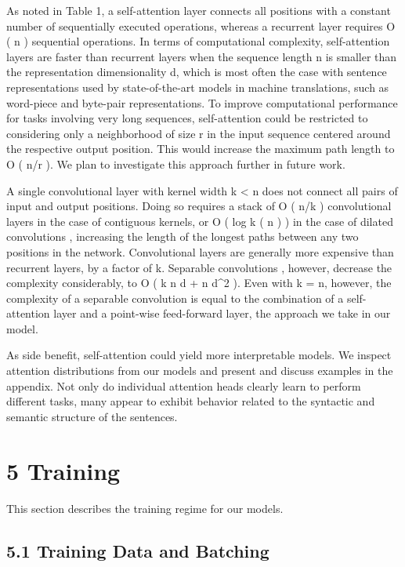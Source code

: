 \documentclass[conference]{IEEEtran}
\begin{document}
As noted in Table 1, a self-attention layer connects all positions with a constant number of sequentially executed operations, whereas a recurrent layer requires O ( n ) sequential operations. In terms of computational complexity, self-attention layers are faster than recurrent layers when the sequence length n is smaller than the representation dimensionality d, which is most often the case with sentence representations used by state-of-the-art models in machine translations, such as word-piece \cite{ref38} and byte-pair \cite{ref31} representations. To improve computational performance for tasks involving very long sequences, self-attention could be restricted to considering only a neighborhood of size r in the input sequence centered around the respective output position. This would increase the maximum path length to O ( n/r ). We plan to investigate this approach further in future work.

A single convolutional layer with kernel width k < n does not connect all pairs of input and output positions. Doing so requires a stack of O ( n/k ) convolutional layers in the case of contiguous kernels, or O ( log k ( n ) ) in the case of dilated convolutions \cite{ref18}, increasing the length of the longest paths between any two positions in the network. Convolutional layers are generally more expensive than recurrent layers, by a factor of k. Separable convolutions \cite{ref6}, however, decrease the complexity considerably, to O ( k \cdot n \cdot d + n \cdot d^2 ). Even with k = n, however, the complexity of a separable convolution is equal to the combination of a self-attention layer and a point-wise feed-forward layer, the approach we take in our model.

As side benefit, self-attention could yield more interpretable models. We inspect attention distributions from our models and present and discuss examples in the appendix. Not only do individual attention heads clearly learn to perform different tasks, many appear to exhibit behavior related to the syntactic and semantic structure of the sentences.

\section{5 Training}

This section describes the training regime for our models.

\subsection{5.1 Training Data and Batching}
\end{document}

